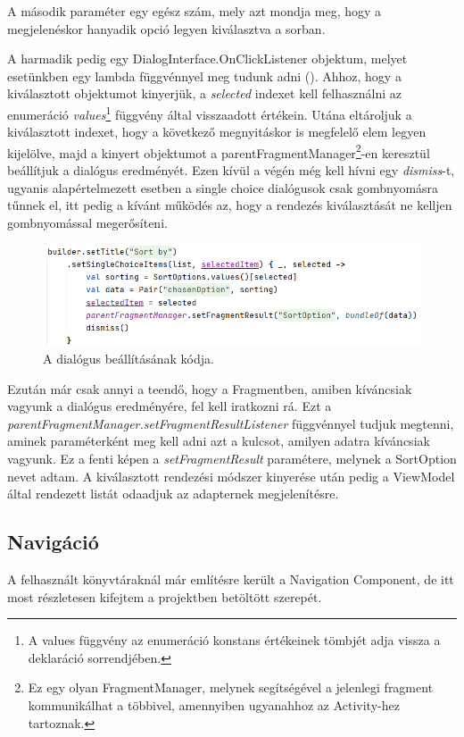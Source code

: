 A második paraméter egy egész szám, mely azt mondja meg, hogy a megjelenéskor hanyadik opció legyen kiválasztva a sorban. 

A harmadik pedig egy DialogInterface.OnClickListener objektum, melyet esetünkben egy lambda függvénnyel meg tudunk adni (). Ahhoz, hogy a kiválasztott objektumot kinyerjük, a \emph{selected} indexet kell felhasználni az enumeráció \emph{values}\footnote{A values függvény az enumeráció konstans értékeinek tömbjét adja vissza a deklaráció sorrendjében.} függvény által visszaadott értékein. Utána eltároljuk a kiválasztott indexet, hogy a következő megnyitáskor is megfelelő elem legyen kijelölve, majd a kinyert objektumot a parentFragmentManager\footnote{Ez egy olyan FragmentManager, melynek segítségével a jelenlegi fragment kommunikálhat a többivel, amennyiben ugyanahhoz az Activity-hez tartoznak.}-en keresztül beállítjuk a dialógus eredményét. Ezen kívül a végén még kell hívni egy \emph{dismiss}-t, ugyanis alapértelmezett esetben a single choice dialógusok csak gombnyomásra tűnnek el, itt pedig a kívánt működés az, hogy a rendezés kiválasztását ne kelljen gombnyomással megerősíteni.

\begin{figure}[!ht]
	\centering
	\includegraphics[width=140mm, keepaspectratio]{figures/dialog_builder.png}
	\caption{A dialógus beállításának kódja.}
	\label{fig:DialogBuilder}
\end{figure}

Ezután már csak annyi a teendő, hogy a Fragmentben, amiben kíváncsiak vagyunk a dialógus eredményére, fel kell iratkozni rá. Ezt a \emph{parentFragmentManager.setFragmentResultListener} függvénnyel tudjuk megtenni, aminek paraméterként meg kell adni azt a kulcsot, amilyen adatra kíváncsiak vagyunk. Ez a fenti képen a \emph{setFragmentResult} paramétere, melynek a SortOption nevet adtam. A kiválasztott rendezési módszer kinyerése után pedig a ViewModel által rendezett listát odaadjuk az adapternek megjelenítésre. 

\subsection{Navigáció}
A felhasznált könyvtáraknál már említésre került a Navigation Component, de itt most részletesen kifejtem a projektben betöltött szerepét. 

